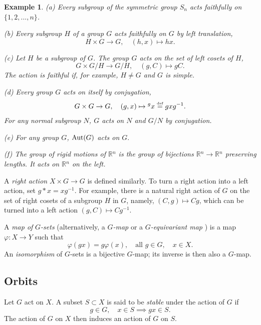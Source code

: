 \documentclass[a4paper,11pt,final,openany]{memoir}%
\newtheorem{example}[X]{Example}
\theoremstyle{nonumberplain}
\begin{document}
\begin{example}
\label{ga02} (a) Every subgroup of the symmetric group $S_{n}$ acts faithfully
on $\{1,2,...,n\}$.

(b) Every subgroup $H$ of a group $G$ acts faithfully on $G$ by left
translation,
\[
H\times G\rightarrow G,\quad(h,x)\mapsto hx.
\]


(c) Let $H$ be a subgroup of $G$. The group $G$ acts on the set of left cosets
of $H$,
\[
G\times G/H\rightarrow G/H,\quad(g,C)\mapsto gC.
\]
The action is faithful if, for example, $H\neq G$ and $G$ is simple.

(d) Every group $G$ acts on itself by conjugation,
\[
G\times G\rightarrow G,\quad(g,x)\mapsto{}^{g}x\overset{\text{{\tiny def}}%
}{=}gxg^{-1}.
\]
For any normal subgroup $N$, $G$ acts on $N$ and $G/N$ by conjugation.

(e) For any group $G$, $\operatorname{Aut}(G)$ acts on $G.$

(f) The \emph{group of rigid motions}%
of $\mathbb{R}{}^{n}$ is the group of bijections $\mathbb{R}{}^{n}%
\rightarrow\mathbb{R}{}^{n}$ preserving lengths. It acts on $\mathbb{R}{}^{n}$
on the left.
\end{example}

A \emph{right action}%
$X\times G\rightarrow G$ is defined similarly. To turn a right action into a
left action, set $g\ast x=xg^{-1}$. For example, there is a natural right
action of $G$ on the set of right cosets of a subgroup $H$ in $G$, namely,
$(C,g)\mapsto Cg$, which can be turned into a left action $(g,C)\mapsto
Cg^{-1}$.

A \emph{map of }$G$\emph{-sets}%
(alternatively, a $G$\emph{-map\/}%
or a $G$\emph{-equivariant map}%
%
\emph{\/}) is a map $\varphi\colon X\rightarrow Y$ such that
\[
\varphi(gx)=g\varphi(x),\quad\text{all }g\in G,\quad x\in X.
\]
An \emph{isomorphism}%
%
\emph{\/} of $G$-sets is a bijective $G$-map; its inverse is then also a $G$-map.

\subsection{Orbits}

Let $G$ act on $X$. A subset $S\subset X$ is said to be \emph{stable\/}%
under the action of $G$ if
\[
g\in G,\quad x\in S\implies gx\in S.
\]
The action of $G$ on $X$ then induces an action of $G$ on $S$.
\end{document}
